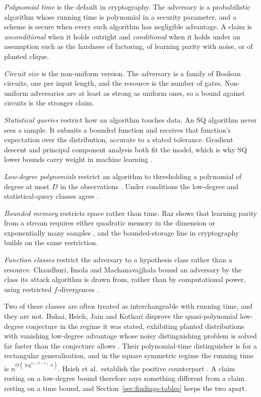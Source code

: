 \emph{Polynomial time} is the default in cryptography. The adversary is a
probabilistic algorithm whose running time is polynomial in a security parameter,
and a scheme is secure when every such algorithm has negligible advantage. A claim
is \emph{unconditional} when it holds outright and \emph{conditional} when it holds
under an assumption such as the hardness of factoring, of learning parity with
noise, or of planted clique.

\emph{Circuit size} is the non-uniform version. The adversary is a family of Boolean
circuits, one per input length, and the resource is the number of gates. Non-uniform
adversaries are at least as strong as uniform ones, so a bound against circuits is
the stronger claim.

\emph{Statistical queries} restrict how an algorithm touches data. An SQ algorithm
never sees a sample. It submits a bounded function and receives that function's
expectation over the distribution, accurate to a stated tolerance. Gradient descent
and principal component analysis both fit the model, which is why SQ lower bounds
carry weight in machine learning \cite{FGRVX17}.

\emph{Low-degree polynomials} restrict an algorithm to thresholding a polynomial of
degree at most $D$ in the observations \cite{Wei25}. Under conditions the low-degree
and statistical-query classes agree \cite{BBHLS21}.

\emph{Bounded memory} restricts space rather than time. Raz shows that learning
parity from a stream requires either quadratic memory in the dimension or
exponentially many samples \cite{Raz16}, and the bounded-storage line in
cryptography builds on the same restriction.

\emph{Function classes} restrict the adversary to a hypothesis class rather than a
resource. Chaudhuri, Imola and Machanavajjhala bound an adversary by the class its
attack algorithm is drawn from, rather than by computational power, using
restricted $f$-divergences \cite{CIM19}.

Two of these classes are often treated as interchangeable with running time, and
they are not. Buhai, Hsieh, Jain and Kothari disprove the quasi-polynomial
low-degree conjecture in the regime it was stated, exhibiting planted distributions
with vanishing low-degree advantage whose noisy distinguishing problem is solved far
faster than the conjecture allows \cite{BHJK25}. Their polynomial-time distinguisher
is for a rectangular generalisation, and in the square symmetric regime the running
time is $n^{O(\log^{1/(k-1)} n)}$. Hsieh et al.\ establish the positive counterpart
\cite{HKKLMT26}. A claim resting on a low-degree bound therefore says something
different from a claim resting on a time bound, and Section~\ref{sec:findings-tables}
keeps the two apart.

